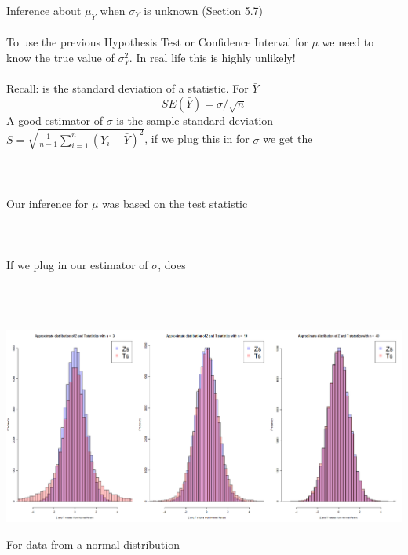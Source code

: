 
\large Inference about $\mu_Y$ when $\sigma_Y$ is unknown (Section 5.7) \normalsize\\~\\

To use the previous Hypothesis Test or Confidence Interval for $\mu$ we need to know the true value of $\sigma^2_Y$.  In real life this is highly unlikely!\\~\\

Recall:  \underbar{~~~~~~~~~~~~~~~~~~~~~~~~~~~~~~~~~~~~~~~~~~~~~~~~~~} is the standard deviation of a statistic.  For $\bar{Y}$
$$SE(\bar{Y})=\sigma/\sqrt{n}$$
A good estimator of $\sigma$ is the sample standard deviation $S=\sqrt{\frac{1}{n-1}\sum_{i=1}^{n}(Y_i-\bar{Y})^2}$, if we plug this in for $\sigma$ we get the \\~\\~\\~\\

Our inference for $\mu$ was based on the test statistic \\~\\~\\~\\
If we plug in our estimator of $\sigma$, does \\~\\~\\~\\
\begin{center}
\includegraphics[scale=0.35]{zandt}
\end{center}
For data from a normal distribution
\newpage

